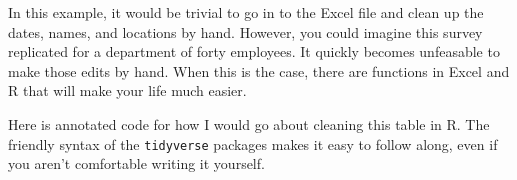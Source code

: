 \documentclass[]{book}
\newenvironment{Shaded}{\begin{snugshade}}{\end{snugshade}}
\newcommand{\DataTypeTok}[1]{\textcolor[rgb]{0.13,0.29,0.53}{#1}}
\newcommand{\KeywordTok}[1]{\textcolor[rgb]{0.13,0.29,0.53}{\textbf{#1}}}
\newcommand{\NormalTok}[1]{#1}
\newcommand{\OperatorTok}[1]{\textcolor[rgb]{0.81,0.36,0.00}{\textbf{#1}}}
\newcommand{\OtherTok}[1]{\textcolor[rgb]{0.56,0.35,0.01}{#1}}
\newcommand{\StringTok}[1]{\textcolor[rgb]{0.31,0.60,0.02}{#1}}
\begin{document}
\begin{Shaded}
\end{Shaded}

\hypertarget{htmlwidget-608d0414c139a7736ea0}{}

In this example, it would be trivial to go in to the Excel file and clean up the dates, names, and locations by hand. However, you could imagine this survey replicated for a department of forty employees. It quickly becomes unfeasable to make those edits by hand. When this is the case, there are functions in Excel and R that will make your life much easier.

Here is annotated code for how I would go about cleaning this table in R. The friendly syntax of the \texttt{tidyverse} packages makes it easy to follow along, even if you aren't comfortable writing it yourself.
\end{document}
